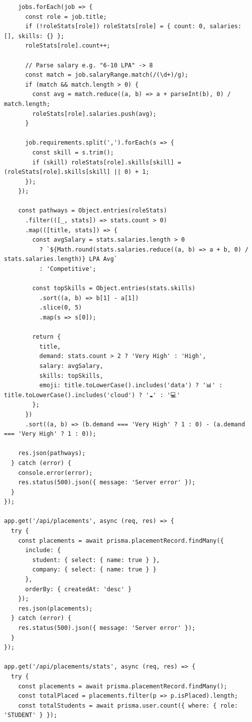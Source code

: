 \documentclass[12pt,a4paper]{report}
\begin{document}
\begin{verbatim}
    jobs.forEach(job => {
      const role = job.title;
      if (!roleStats[role]) roleStats[role] = { count: 0, salaries: [], skills: {} };
      roleStats[role].count++;
      
      // Parse salary e.g. "6-10 LPA" -> 8
      const match = job.salaryRange.match(/(\d+)/g);
      if (match && match.length > 0) {
        const avg = match.reduce((a, b) => a + parseInt(b), 0) / match.length;
        roleStats[role].salaries.push(avg);
      }

      job.requirements.split(',').forEach(s => {
        const skill = s.trim();
        if (skill) roleStats[role].skills[skill] = (roleStats[role].skills[skill] || 0) + 1;
      });
    });

    const pathways = Object.entries(roleStats)
      .filter(([_, stats]) => stats.count > 0)
      .map(([title, stats]) => {
        const avgSalary = stats.salaries.length > 0 
          ? `${Math.round(stats.salaries.reduce((a, b) => a + b, 0) / stats.salaries.length)} LPA Avg` 
          : 'Competitive';
        
        const topSkills = Object.entries(stats.skills)
          .sort((a, b) => b[1] - a[1])
          .slice(0, 5)
          .map(s => s[0]);

        return {
          title,
          demand: stats.count > 2 ? 'Very High' : 'High',
          salary: avgSalary,
          skills: topSkills,
          emoji: title.toLowerCase().includes('data') ? '📊' : title.toLowerCase().includes('cloud') ? '☁️' : '💻'
        };
      })
      .sort((a, b) => (b.demand === 'Very High' ? 1 : 0) - (a.demand === 'Very High' ? 1 : 0));

    res.json(pathways);
  } catch (error) {
    console.error(error);
    res.status(500).json({ message: 'Server error' });
  }
});

app.get('/api/placements', async (req, res) => {
  try {
    const placements = await prisma.placementRecord.findMany({
      include: {
        student: { select: { name: true } },
        company: { select: { name: true } }
      },
      orderBy: { createdAt: 'desc' }
    });
    res.json(placements);
  } catch (error) {
    res.status(500).json({ message: 'Server error' });
  }
});

app.get('/api/placements/stats', async (req, res) => {
  try {
    const placements = await prisma.placementRecord.findMany();
    const totalPlaced = placements.filter(p => p.isPlaced).length;
    const totalStudents = await prisma.user.count({ where: { role: 'STUDENT' } });


\end{verbatim}
\end{document}

